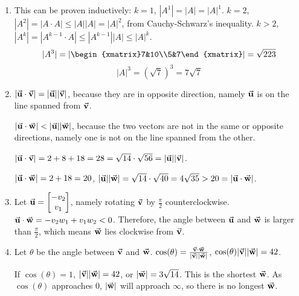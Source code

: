\begin{exercise}{10}
  \begin{enumerate}
    \item This can be proven inductively: $k = 1$, $|A^1| = |A| = |A|^1$. $k = 2$, $|A^2| = |A \cdot A| \leq |A||A| = |A|^2$, from Cauchy-Schwarz's inequality. $k > 2$, $|A^k| = |A^{k-1} \cdot A| \leq |A^{k-1}||A| \leq |A|^k$. \rQED
          $$|A^3| = |\begin{xmatrix}7&10\\5&7\end{xmatrix}| = \sqrt{223}$$
          $$|A|^3 = (\sqrt{7})^3 = 7\sqrt{7}$$
          
    \item $|\vec{\mathbf{u}} \cdot \vec{\mathbf{v}}| = |\vec{\mathbf{u}}||\vec{\mathbf{v}}|$, because they are in opposite direction, namely $\vec{\mathbf{u}}$ is on the line spanned from $\vec{\mathbf{v}}$.
          
          $|\vec{\mathbf{u}} \cdot \vec{\mathbf{w}}| < |\vec{\mathbf{u}}||\vec{\mathbf{w}}|$, because the two vectors are not in the same or opposite directions, namely one is not on the line spanned from the other.
          
          $|\vec{\mathbf{u}} \cdot \vec{\mathbf{v}}| = 2 + 8 + 18 = 28 = \sqrt{14} \cdot \sqrt{56} = |\vec{\mathbf{u}}||\vec{\mathbf{v}}|$.
          
          $|\vec{\mathbf{u}} \cdot \vec{\mathbf{w}}| = 2 + 18 = 20$, $|\vec{\mathbf{u}}||\vec{\mathbf{w}}| = \sqrt{14} \cdot \sqrt{40} = 4\sqrt{35} > 20 = |\vec{\mathbf{u}} \cdot \vec{\mathbf{w}}|$.
    
    \item Let $\vec{\mathbf{u}} = \begin{bmatrix}-v_2\\v_1\end{bmatrix}$, namely rotating $\vec{\mathbf{v}}$ by $\frac{\pi}{2}$ counterclockwise. $\vec{\mathbf{u}} \cdot \vec{\mathbf{w}} = -v_2w_1 + v_1w_2 < 0$. Therefore, the angle between $\vec{\mathbf{u}}$ and $\vec{\mathbf{w}}$ is larger than $\frac{\pi}{2}$, which means $\vec{\mathbf{w}}$ lies clockwise from $\vec{\mathbf{v}}$.
    
    \item Let $\theta$ be the angle between $\vec{\mathbf{v}}$ and $\vec{\mathbf{w}}$. $\cos(\theta) = \frac{\vec{\mathbf{v}} \cdot \vec{\mathbf{w}}}{|\vec{\mathbf{v}}||\vec{\mathbf{w}}|}$, $\cos(\theta)|\vec{\mathbf{v}}||\vec{\mathbf{w}}| = 42$.
    
          If $\cos(\theta) = 1$, $|\vec{\mathbf{v}}||\vec{\mathbf{w}}| = 42$, or $|\vec{\mathbf{w}}| = 3\sqrt{14}$. This is the shortest $\vec{\mathbf{w}}$. As $\cos(\theta)$ approaches $0$, $|\vec{\mathbf{w}}|$ will approach $\infty$, so there is no longest $\vec{\mathbf{w}}$.
  \end{enumerate}
\end{exercise}

